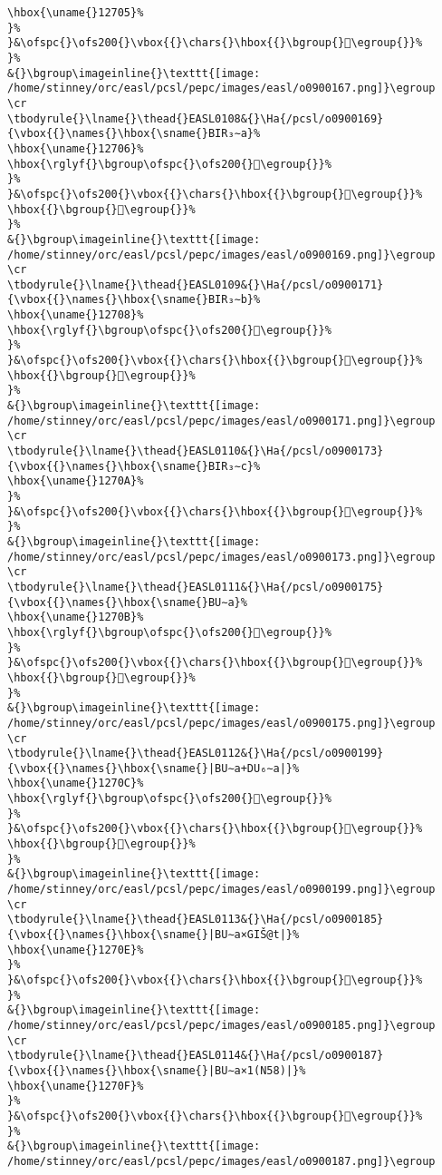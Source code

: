 \begin{verbatim}
\hbox{\uname{}12705}%
}%
}&\ofspc{}\ofs200{}\vbox{{}\chars{}\hbox{{}\bgroup{}𒜅\egroup{}}%
}%
&{}\bgroup\imageinline{}\texttt{[image: /home/stinney/orc/easl/pcsl/pepc/images/easl/o0900167.png]}\egroup
\cr
\tbodyrule{}\lname{}\thead{}EASL0108&{}\Ha{/pcsl/o0900169}{\vbox{{}\names{}\hbox{\sname{}BIR₃∼a}%
\hbox{\uname{}12706}%
\hbox{\rglyf{}\bgroup\ofspc{}\ofs200{}𒜆\egroup{}}%
}%
}&\ofspc{}\ofs200{}\vbox{{}\chars{}\hbox{{}\bgroup{}𒜇\egroup{}}%
\hbox{{}\bgroup{}𒜆\egroup{}}%
}%
&{}\bgroup\imageinline{}\texttt{[image: /home/stinney/orc/easl/pcsl/pepc/images/easl/o0900169.png]}\egroup
\cr
\tbodyrule{}\lname{}\thead{}EASL0109&{}\Ha{/pcsl/o0900171}{\vbox{{}\names{}\hbox{\sname{}BIR₃∼b}%
\hbox{\uname{}12708}%
\hbox{\rglyf{}\bgroup\ofspc{}\ofs200{}𒜈\egroup{}}%
}%
}&\ofspc{}\ofs200{}\vbox{{}\chars{}\hbox{{}\bgroup{}𒜉\egroup{}}%
\hbox{{}\bgroup{}𒜈\egroup{}}%
}%
&{}\bgroup\imageinline{}\texttt{[image: /home/stinney/orc/easl/pcsl/pepc/images/easl/o0900171.png]}\egroup
\cr
\tbodyrule{}\lname{}\thead{}EASL0110&{}\Ha{/pcsl/o0900173}{\vbox{{}\names{}\hbox{\sname{}BIR₃∼c}%
\hbox{\uname{}1270A}%
}%
}&\ofspc{}\ofs200{}\vbox{{}\chars{}\hbox{{}\bgroup{}𒜊\egroup{}}%
}%
&{}\bgroup\imageinline{}\texttt{[image: /home/stinney/orc/easl/pcsl/pepc/images/easl/o0900173.png]}\egroup
\cr
\tbodyrule{}\lname{}\thead{}EASL0111&{}\Ha{/pcsl/o0900175}{\vbox{{}\names{}\hbox{\sname{}BU∼a}%
\hbox{\uname{}1270B}%
\hbox{\rglyf{}\bgroup\ofspc{}\ofs200{}𒜋\egroup{}}%
}%
}&\ofspc{}\ofs200{}\vbox{{}\chars{}\hbox{{}\bgroup{}𒜓\egroup{}}%
\hbox{{}\bgroup{}𒜋\egroup{}}%
}%
&{}\bgroup\imageinline{}\texttt{[image: /home/stinney/orc/easl/pcsl/pepc/images/easl/o0900175.png]}\egroup
\cr
\tbodyrule{}\lname{}\thead{}EASL0112&{}\Ha{/pcsl/o0900199}{\vbox{{}\names{}\hbox{\sname{}|BU∼a+DU₆∼a|}%
\hbox{\uname{}1270C}%
\hbox{\rglyf{}\bgroup\ofspc{}\ofs200{}𒜌\egroup{}}%
}%
}&\ofspc{}\ofs200{}\vbox{{}\chars{}\hbox{{}\bgroup{}𒜌\egroup{}}%
\hbox{{}\bgroup{}𒜍\egroup{}}%
}%
&{}\bgroup\imageinline{}\texttt{[image: /home/stinney/orc/easl/pcsl/pepc/images/easl/o0900199.png]}\egroup
\cr
\tbodyrule{}\lname{}\thead{}EASL0113&{}\Ha{/pcsl/o0900185}{\vbox{{}\names{}\hbox{\sname{}|BU∼a×GIŠ@t|}%
\hbox{\uname{}1270E}%
}%
}&\ofspc{}\ofs200{}\vbox{{}\chars{}\hbox{{}\bgroup{}𒜎\egroup{}}%
}%
&{}\bgroup\imageinline{}\texttt{[image: /home/stinney/orc/easl/pcsl/pepc/images/easl/o0900185.png]}\egroup
\cr
\tbodyrule{}\lname{}\thead{}EASL0114&{}\Ha{/pcsl/o0900187}{\vbox{{}\names{}\hbox{\sname{}|BU∼a×1(N58)|}%
\hbox{\uname{}1270F}%
}%
}&\ofspc{}\ofs200{}\vbox{{}\chars{}\hbox{{}\bgroup{}𒜏\egroup{}}%
}%
&{}\bgroup\imageinline{}\texttt{[image: /home/stinney/orc/easl/pcsl/pepc/images/easl/o0900187.png]}\egroup

\end{verbatim}
